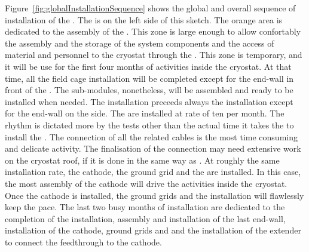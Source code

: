 Figure~\ref{fig:globalInstallationSequence} shows the global and overall sequence of installation of the  .
The  is on the left side of this sketch.
The orange area is dedicated to the assembly of the .
This zone is large enough to allow confortably the assembly and the storage of the  system components and the access of material and personnel to the cryostat through the .
This zone is temporary, and it will be use for the first four months of activities inside the cryostat.
At that time, all the field cage installation will be completed except for the end-wall in front of the .
The  sub-modules, nonetheless, will be assembled and ready to be installed when needed.
The  installation preceeds always the  installation except for the end-wall on the  side.
The  are installed at rate of ten  per month.
The rhythm is dictated more by the  \coldbox tests other than the actual time it takes the to install the .
The connection of all the  related cables is the most time consuming and delicate activity.
The finalisation of the   connection may need extensive work on the cryostat roof, if it is done in the same way as .
At roughly the same installation rate, the cathode, the ground grid and the  are installed.
In this case, the most assembly of the cathode will drive the activities inside the cryostat.
Once the cathode is installed, the ground grids and the  installation will flawlessly keep the pace.
The last two busy months of  installation are dedicated to the completion of the  installation, assembly and installation of the last  end-wall, installation of the cathode, ground grids and  and the installation of the  extender to connect the  feedthrough to the cathode.



